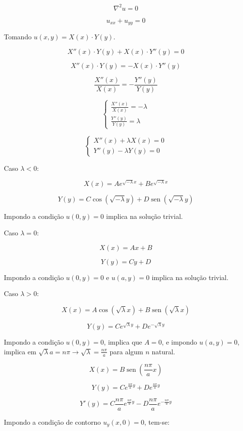 \documentclass[12pt, a4paper, portuguese]{fphw}
\DeclareMathOperator{\sen}{sen}
\begin{document}
$$
\nabla^2 u = 0
$$

$$
u_{xx} + u_{yy} = 0
$$

Tomando $ u(x, y) = X(x) \cdot Y(y) $.

$$
X''(x) \cdot Y(y) + X(x) \cdot Y''(y) = 0
$$

$$
X''(x) \cdot Y(y) = -X(x) \cdot Y''(y)
$$

$$
\frac{X''(x)}{X(x)} = - \frac{Y''(y)}{Y(y)}
$$

$$
\begin{cases}
\frac{X''(x)}{X(x)} = - \lambda \\
\frac{Y''(y)}{Y(y)} = \lambda
\end{cases}
$$

$$
\begin{cases}
X''(x) + \lambda X(x) = 0 \\
Y''(y) - \lambda Y(y) = 0
\end{cases}
$$

Caso $ \lambda < 0 $:

$$
X(x) = A e^{\sqrt{-\lambda} x} + B e^{\sqrt{-\lambda} x}
$$

$$
Y(y) = C \cos \left( \sqrt{-\lambda} y \right) + D \sen \left( \sqrt{-\lambda} y \right)
$$

Impondo a condição $ u(0, y) = 0 $ implica na solução trivial.

Caso $ \lambda = 0 $:

$$
X(x) = Ax + B
$$

$$
Y(y) = Cy + D
$$

Impondo a condição $ u(0, y) = 0 $ e $ u(a, y) = 0 $ implica na solução trivial.

Caso $ \lambda > 0 $:

$$
X(x) = A \cos \left( \sqrt{\lambda} x \right) + B \sen \left( \sqrt{\lambda} x \right)
$$

$$
Y(y) = C e^{\sqrt{\lambda} y} + D e^{-\sqrt{\lambda} y}
$$

Impondo a condição $ u(0, y) = 0 $, implica que $ A = 0 $, e impondo $ u(a, y) = 0 $, implica em $ \sqrt{\lambda} a = n \pi \rightarrow \sqrt{\lambda} = \frac{n \pi}{a} $ para algum $ n $ natural.

$$
X(x) = B \sen \left( \frac{n \pi}{a} x \right)
$$

$$
Y(y) = C e^{\frac{n \pi}{a} y} + D e^{\frac{n \pi}{a} y}
$$

$$
Y'(y) = C \frac{n \pi}{a} e^{\frac{n \pi}{a} y} - D \frac{n \pi}{a} e^{-\frac{n \pi}{a} y}
$$

Impondo a condição de contorno $ u_y(x, 0) = 0 $, tem-se:
\end{document}
